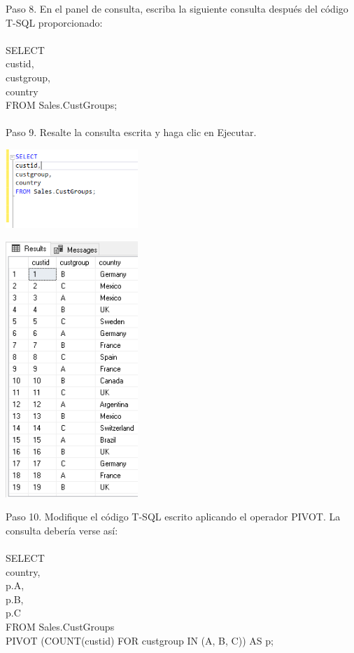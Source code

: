 \begin{flushleft}
Paso 8. En el panel de consulta, escriba la siguiente consulta después del código T-SQL proporcionado:
\textbf{}\\
\textbf{}\\
SELECT\\
custid,\\
custgroup,\\
country\\
FROM Sales.CustGroups;\\

\textbf{}\\
Paso 9. Resalte la consulta escrita y haga clic en Ejecutar.
\begin{center}
	\includegraphics[width=5cm]{./Imagenes/img9} 
	\end{center}
\begin{center}
	\includegraphics[width=5cm]{./Imagenes/img91} 
	\end{center}


Paso 10. Modifique el código T-SQL escrito aplicando el operador PIVOT. La consulta debería verse así:
\textbf{}\\
\textbf{}\\
SELECT\\
country,\\
p.A,\\
p.B,\\
p.C\\
FROM Sales.CustGroups\\
PIVOT (COUNT(custid) FOR custgroup IN (A, B, C)) AS p;\\


\end{flushleft}
